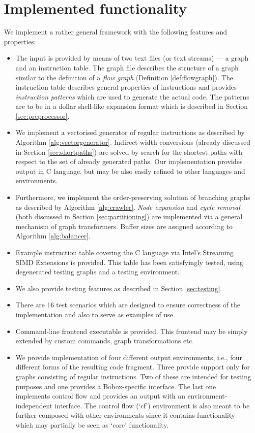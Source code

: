 \section{Implemented functionality}

We implement a rather general framework with the following features and properties:
\begin{itemize}
  \item The input is provided by means of two text files (or text streams) --- a graph and an instruction table. The graph file describes the structure of a graph similar to the definition of a \emph{flow graph} (Definition \ref{def:flowgraph}). The instruction table describes general properties of instructions and provides \emph{instruction patterns} which are used to generate the actual code. The patterns are to be in a dollar shell-like expansion format which is described in Section \ref{sec:preprocessor}.
  \item We implement a vectorised generator of regular instructions as described by Algorithm \ref{alg:vectorgenerator}. Indirect width conversions (already discussed in Section \ref{sec:shortpaths}) are solved by search for the shortest paths with respect to the set of already generated paths. Our implementation provides output in C language, but may be also easily refined to other languages and environments.
  \item Furthermore, we implement the order-preserving solution of branching graphs as described by Algorithm \ref{alg:crawler}. \emph{Node expansion} and \emph{cycle removal} (both discussed in Section \ref{sec:partitioning}) are implemented via a general mechanism of graph transformers. Buffer sizes are assigned according to Algorithm \ref{alg:balancer}.
  \item Example instruction table covering the C language via Intel's Streaming SIMD Extensions is provided. This table has been satisfyingly tested, using degenerated testing graphs and a testing environment.
  \item We also provide testing features as described in Section \ref{sec:testing}. 
  \item There are 16 test scenarios which are designed to ensure correctness of the implementation and also to serve as examples of use.
  \item Command-line frontend executable is provided. This frontend may be simply extended by custom commands, graph transformations etc.
  \item We provide implementation of four different output environments, i.e., four different forms of the resulting code fragment. Three provide support only for graphs consisting of regular instructions. Two of these are intended for testing purposes and one provides a Bobox-specific interface. The last one implements control flow and provides an output with an environment-independent interface. The control flow (`cf') environment is also meant to be further composed with other environments since it contains functionality which may partially be seen as `core' functionality.
\end{itemize}

